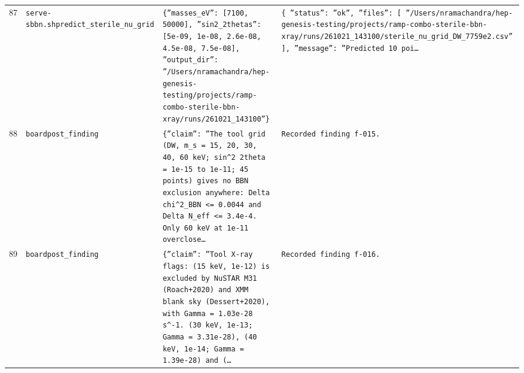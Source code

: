 \documentclass[11pt,a4paper]{article}
\begin{document}
\begin{longtable}{@{}p{}p{}p{}p{}@{}}
87 & \texttt{serve-sbbn.sh}\newline\texttt{predict\_\allowbreak{}sterile\_\allowbreak{}nu\_\allowbreak{}grid} & \texttt{\{''masses\_\allowbreak{}eV'':\allowbreak{} [7100,\allowbreak{} 50000]\allowbreak{},\allowbreak{} ''sin2\_\allowbreak{}2thetas'':\allowbreak{} [5e-09,\allowbreak{} 1e-08,\allowbreak{} 2.6e-08,\allowbreak{} 4.5e-08,\allowbreak{} 7.5e-08]\allowbreak{},\allowbreak{} ''output\_\allowbreak{}dir'':\allowbreak{} ''/\allowbreak{}Users/\allowbreak{}nramachandra/\allowbreak{}hep-genesis-testing/\allowbreak{}projects/\allowbreak{}ramp-combo-sterile-bbn-xray/\allowbreak{}runs/\allowbreak{}261021\_\allowbreak{}143100''\}\allowbreak{}} & \texttt{\{   ''status'':\allowbreak{} ''ok'',\allowbreak{}   ''files'':\allowbreak{} [     ''/\allowbreak{}Users/\allowbreak{}nramachandra/\allowbreak{}hep-genesis-testing/\allowbreak{}projects/\allowbreak{}ramp-combo-sterile-bbn-xray/\allowbreak{}runs/\allowbreak{}261021\_\allowbreak{}143100/\allowbreak{}sterile\_\allowbreak{}nu\_\allowbreak{}grid\_\allowbreak{}DW\_\allowbreak{}7759e2.csv''   ]\allowbreak{},\allowbreak{}   ''message'':\allowbreak{} ''Predicted 10 poi\ldots{}\allowbreak{}} \\
88 & \texttt{board}\newline\texttt{post\_\allowbreak{}finding} & \texttt{\{''claim'':\allowbreak{} ''The tool grid (DW,\allowbreak{} m\_\allowbreak{}s =\allowbreak{} 15,\allowbreak{} 20,\allowbreak{} 30,\allowbreak{} 40,\allowbreak{} 60 keV;\allowbreak{} sin\textasciicircum{}\allowbreak{}2 2theta =\allowbreak{} 1e-15 to 1e-11;\allowbreak{} 45 points)\allowbreak{} gives no BBN exclusion anywhere:\allowbreak{} \textbar{}\allowbreak{}Delta chi\textasciicircum{}\allowbreak{}2\_\allowbreak{}BBN\textbar{}\allowbreak{} \textless{}\allowbreak{}=\allowbreak{} 0.0044 and Delta N\_\allowbreak{}eff \textless{}\allowbreak{}=\allowbreak{} 3.4e-4. Only 60 keV at 1e-11 overclose\ldots{}\allowbreak{}} & \texttt{Recorded finding f-015.} \\
89 & \texttt{board}\newline\texttt{post\_\allowbreak{}finding} & \texttt{\{''claim'':\allowbreak{} ''Tool X-ray flags:\allowbreak{} (15 keV,\allowbreak{} 1e-12)\allowbreak{} is excluded by NuSTAR M31 (Roach+2020)\allowbreak{} and XMM blank sky (Dessert+2020)\allowbreak{},\allowbreak{} with Gamma =\allowbreak{} 1.03e-28 s\textasciicircum{}\allowbreak{}-1. (30 keV,\allowbreak{} 1e-13;\allowbreak{} Gamma =\allowbreak{} 3.31e-28)\allowbreak{},\allowbreak{} (40 keV,\allowbreak{} 1e-14;\allowbreak{} Gamma =\allowbreak{} 1.39e-28)\allowbreak{} and (\ldots{}\allowbreak{}} & \texttt{Recorded finding f-016.} \\

\end{longtable}
\end{document}
